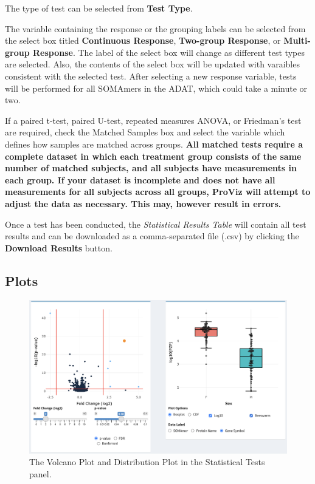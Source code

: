\documentclass[
]{book}
\begin{document}
The type of test can be selected from \textbf{Test Type}.

The variable containing the response or the grouping labels can be selected from the select box titled \textbf{Continuous Response}, \textbf{Two-group Response}, or \textbf{Multi-group Response}. The label of the select box will change as different test types are selected. Also, the contents of the select box will be updated with varaibles consistent with the selected test. After selecting a new response variable, tests will be performed for all SOMAmers in the ADAT, which could take a minute or two.

If a paired t-test, paired U-test, repeated measures ANOVA, or Friedman's test are required, check the Matched Samples box and select the variable which defines how samples are matched across groups. \textbf{All matched tests require a complete dataset in which each treatment group consists of the same number of matched subjects, and all subjects have measurements in each group. If your dataset is incomplete and does not have all measurements for all subjects across all groups, ProViz will attempt to adjust the data as necessary. This may, however result in errors.}

Once a test has been conducted, the \emph{Statistical Results Table} will contain all test results and can be downloaded as a comma-separated file (.csv) by clicking the \textbf{Download Results} button.

\hypertarget{plots-1}{%
\subsection{Plots}\label{plots-1}}

\begin{figure}
\centering
\includegraphics{images/StatTest_Volcano.png}
\caption{The Volcano Plot and Distribution Plot in the Statistical Tests panel.}
\end{figure}
\end{document}
